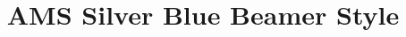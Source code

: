 \newcommand{\swatch}[1]{\fcolorbox{sbgreyline}{#1}{\rule{0pt}{1.3ex}\rule{2.2ex}{0pt}}}
\newcommand{\swgroup}[1]{\multicolumn{2}{@{}l}{\textcolor{sbbluedeep}{\textbf{#1}}}}
\title[AMS Silver Blue Beamer Style]
{AMS Silver Blue Beamer Style}
